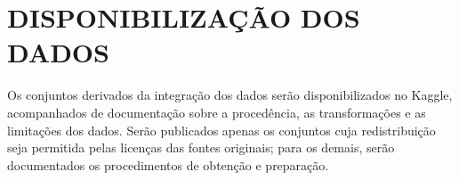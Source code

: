 \section{DISPONIBILIZAÇÃO DOS DADOS}

Os conjuntos derivados da integração dos dados serão disponibilizados no Kaggle, acompanhados de documentação sobre a procedência, as transformações e as limitações dos dados. Serão publicados apenas os conjuntos cuja redistribuição seja permitida pelas licenças das fontes originais; para os demais, serão documentados os procedimentos de obtenção e preparação.
